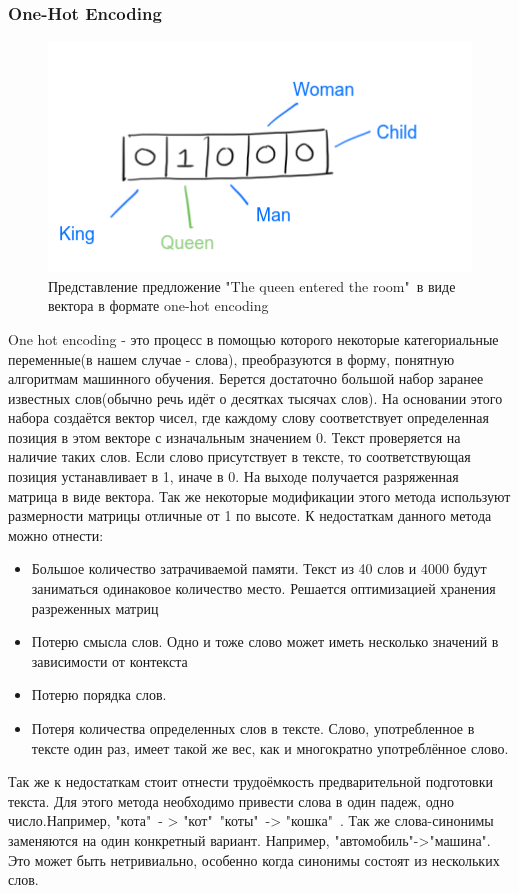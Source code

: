 \subsubsection{One-Hot Encoding}
\begin{figure}[!h]
	\centering
	\includegraphics[width=.5\textwidth]{master_img/word2vec-one-hot_edited.png}
	\caption{Представление предложение "The queen entered the room"\ в виде вектора в формате one-hot encoding}
	\label{fig02_master}
\end{figure}
One hot encoding - это процесс в помощью которого некоторые категориальные  переменные(в нашем случае - слова), преобразуются в форму, понятную алгоритмам машинного обучения. Берется достаточно большой набор заранее известных слов(обычно речь идёт о десятках тысячах слов). На основании этого набора создаётся вектор чисел, где каждому слову соответствует  определенная позиция в этом векторе с изначальным  значением 0. Текст проверяется на наличие таких слов. Если слово присутствует  в тексте, то соответствующая  позиция устанавливает в 1, иначе в 0. На выходе получается разряженная матрица в виде вектора. Так же некоторые модификации этого метода используют размерности матрицы отличные от 1 по высоте.
К недостаткам данного метода можно отнести:
\begin{itemize}
	\item Большое количество затрачиваемой памяти. Текст из 40 слов и 4000 будут заниматься одинаковое количество место. Решается оптимизацией хранения разреженных матриц
	\item Потерю смысла слов. Одно и тоже слово может иметь несколько значений в зависимости от контекста
	\item Потерю порядка слов.
	\item Потеря количества определенных слов в тексте. Слово, употребленное в тексте один раз, имеет такой же вес, как и многократно употреблённое слово.
\end{itemize}
Так же к недостаткам стоит отнести трудоёмкость предварительной подготовки текста.
Для этого метода необходимо привести слова в один падеж, одно число.Например, "кота"\ - > "кот"\, "коты"\ -> "кошка"\ . Так же слова-синонимы заменяются на один конкретный вариант. Например, "автомобиль"->"машина". Это может быть нетривиально, особенно когда синонимы состоят из нескольких слов.


